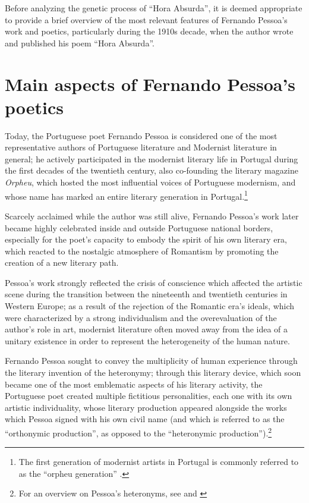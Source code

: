 \begin{paper}
Before analyzing the genetic process of ``Hora Absurda'', it is deemed
appropriate to provide a brief overview of the most relevant features of
Fernando Pessoa's work and poetics, particularly during the 1910s
decade, when the author wrote and published his poem ``Hora Absurda''.

\section{Main aspects of Fernando Pessoa's poetics}

Today, the Portuguese poet Fernando Pessoa is considered one of the most
representative authors of Portuguese literature and Modernist literature
in general; he actively participated in the modernist literary life in
Portugal during the first decades of the twentieth century, also co-founding
the literary magazine \emph{Orpheu}, which hosted the most influential
voices of Portuguese modernism, and whose name has marked an entire
literary generation in Portugal.\footnote{The first generation of
  modernist artists in Portugal is commonly referred to as the ``orpheu
  generation'' \parencite{martins_orpheu_1994}.}

Scarcely acclaimed while the author was still alive, Fernando Pessoa's
work later became highly celebrated inside and outside Portuguese
national borders, especially for the poet's capacity to embody the
spirit of his own literary era, which reacted to the nostalgic
atmosphere of Romantism by promoting the creation of a new literary
path.

Pessoa's work strongly reflected the crisis of conscience which affected
the artistic scene during the transition between the nineteenth and
twentieth centuries in Western Europe; as a result of the rejection of
the Romantic era's ideals, which were characterized by a strong
individualism and the overevaluation of the author's role in art,
modernist literature often moved away from the idea of a unitary
existence in order to represent the heterogeneity of the human nature.

Fernando Pessoa sought to convey the multiplicity of human experience 
through the literary invention of the heteronymy; through this
literary device, which soon became one of the most emblematic aspects of
his literary activity, the Portuguese poet created multiple fictitious
personalities, each one with its own artistic individuality, whose
literary production appeared alongside the works which Pessoa
signed with his own civil name (and which is referred to as the
``orthonymic production'', as opposed to the ``heteronymic
production'').\footnote{For an overview on Pessoa's heteronyms, see \cite{zenith_pessoa_2021} and \cite{pessoa_eu_2013}}


\end{paper}

